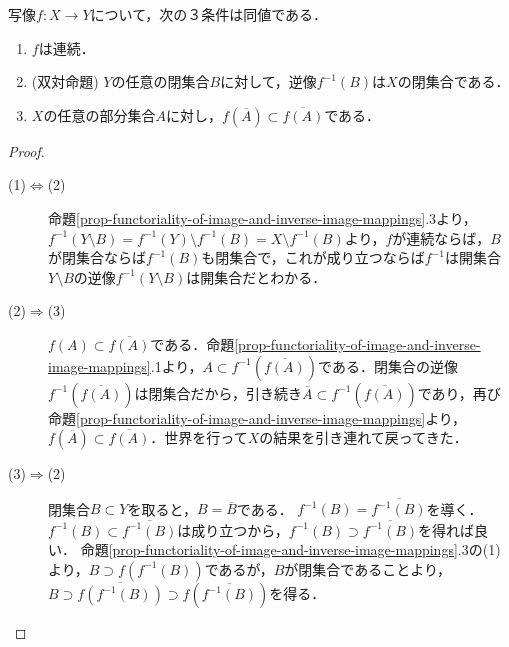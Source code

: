 \documentclass[uplatex,dvipdfmx]{jsreport}
\begin{document}
\begin{proposition}\label{prop-continuous-map-and-closure}
    写像$f:X\to Y$について，次の３条件は同値である．
    \begin{enumerate}
        \item $f$は連続．
        \item (双対命題) $Y$の任意の閉集合$B$に対して，逆像$f^{-1}(B)$は$X$の閉集合である．
        \item $X$の任意の部分集合$A$に対し，$f(\overline{A})\subset\overline{f(A)}$である．
    \end{enumerate}
\end{proposition}
\begin{proof}\mbox{}
    \begin{description}
        \item[(1)$\Leftrightarrow$(2)] 命題\ref{prop-functoriality-of-image-and-inverse-image-mappings}.3より，$f^{-1}(Y\setminus B)=f^{-1}(Y)\setminus f^{-1}(B)=X\setminus f^{-1}(B)$より，$f$が連続ならば，$B$が閉集合ならば$f^{-1}(B)$も閉集合で，これが成り立つならば$f^{-1}$は開集合$Y\setminus B$の逆像$f^{-1}(Y\setminus B)$は開集合だとわかる．
        \item[(2)$\Rightarrow$(3)] $f(A)\subset\overline{f(A)}$である．命題\ref{prop-functoriality-of-image-and-inverse-image-mappings}.1より，$A\subset f^{-1}(\overline{f(A)})$である．閉集合の逆像$f^{-1}(\overline{f(A)})$は閉集合だから，引き続き$\overline{A}\subset f^{-1}(\overline{f(A)})$であり，再び命題\ref{prop-functoriality-of-image-and-inverse-image-mappings}より，$f(\overline{A})\subset \overline{f(A)}$．世界を行って$X$の結果を引き連れて戻ってきた．
        \item[(3)$\Rightarrow$(2)] 閉集合$B\subset Y$を取ると，$B=\overline{B}$である．
        $f^{-1}(B)=\overline{f^{-1}(B)}$を導く．$f^{-1}(B)\subset\overline{f^{-1}(B)}$は成り立つから，$f^{-1}(B)\supset\overline{f^{-1}(B)}$を得れば良い．
        命題\ref{prop-functoriality-of-image-and-inverse-image-mappings}.3の(1)より，$B\supset f(f^{-1}(B))$であるが，$B$が閉集合であることより，$B\supset\overline{f(f^{-1}(B))}\supset f(\overline{f^{-1}(B)})$を得る．
    \end{description}
\end{proof}
\end{document}
